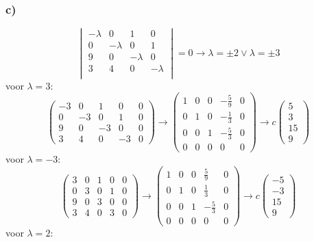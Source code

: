 \documentclass[11pt]{article}
\begin{document}
\subsubsection*{c)}
\[
\begin{vmatrix}
-\lambda & 0 & 1 & 0\\
0 & -\lambda & 0 & 1\\
9 & 0 & -\lambda & 0\\
3 & 4 & 0 & -\lambda\\
\end{vmatrix}
=0
\longrightarrow
\lambda = \pm 2 \vee \lambda = \pm 3
\]
voor $\lambda=3$:
\[
\left(
\begin{array}{cccc|c}
-3 & 0 & 1 & 0 & 0\\
0 & -3 & 0 & 1 & 0\\
9 & 0 & -3 & 0 & 0\\
3 & 4 & 0 & -3 & 0
\end{array}
\right)
\longrightarrow
\left(
\begin{array}{cccc|c}
1 & 0 & 0 & -\frac{5}{9} & 0\\
0 & 1 & 0 & -\frac{1}{3} & 0\\
0 & 0 & 1 & -\frac{5}{3} & 0\\
0 & 0 & 0 & 0 & 0
\end{array}
\right)
\longrightarrow
c
\begin{pmatrix}
5\\3\\15\\9
\end{pmatrix}
\]
voor $\lambda=-3$:
\[
\left(
\begin{array}{cccc|c}
3 & 0 & 1 & 0 & 0\\
0 & 3 & 0 & 1 & 0\\
9 & 0 & 3 & 0 & 0\\
3 & 4 & 0 & 3 & 0
\end{array}
\right)
\longrightarrow
\left(
\begin{array}{cccc|c}
1 & 0 & 0 & \frac{5}{9} & 0\\
0 & 1 & 0 & \frac{1}{3} & 0\\
0 & 0 & 1 & -\frac{5}{3} & 0\\
0 & 0 & 0 & 0 & 0
\end{array}
\right)
\longrightarrow
c
\begin{pmatrix}
-5\\-3\\15\\9
\end{pmatrix}
\]
voor $\lambda=2$:
\end{document}
